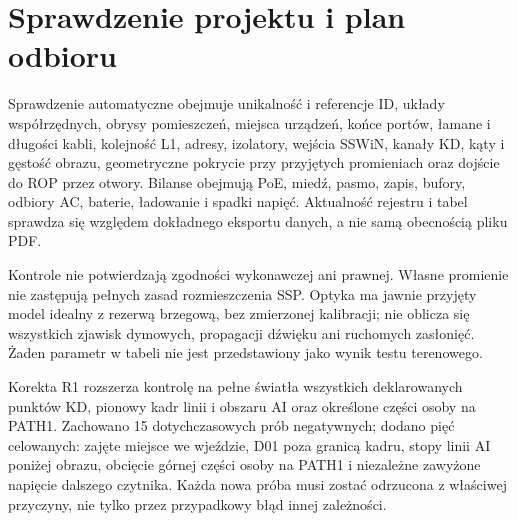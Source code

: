 \section{Sprawdzenie projektu i plan odbioru}
Sprawdzenie automatyczne obejmuje unikalność i referencje ID, układy współrzędnych, obrysy pomieszczeń, miejsca urządzeń, końce portów, łamane i długości kabli, kolejność L1, adresy, izolatory, wejścia SSWiN, kanały KD, kąty i gęstość obrazu, geometryczne pokrycie przy przyjętych promieniach oraz dojście do ROP przez otwory. Bilanse obejmują PoE, miedź, pasmo, zapis, bufory, odbiory AC, baterie, ładowanie i spadki napięć. Aktualność rejestru i tabel sprawdza się względem dokładnego eksportu danych, a nie samą obecnością pliku PDF.

Kontrole nie potwierdzają zgodności wykonawczej ani prawnej. Własne promienie nie zastępują pełnych zasad rozmieszczenia SSP. Optyka ma jawnie przyjęty model idealny z rezerwą brzegową, bez zmierzonej kalibracji; nie oblicza się wszystkich zjawisk dymowych, propagacji dźwięku ani ruchomych zasłonięć. Żaden parametr w tabeli nie jest przedstawiony jako wynik testu terenowego.

Korekta R1 rozszerza kontrolę na pełne światła wszystkich deklarowanych punktów KD, pionowy kadr linii i obszaru AI oraz określone części osoby na PATH1. Zachowano 15 dotychczasowych prób negatywnych; dodano pięć celowanych: zajęte miejsce we wjeździe, D01 poza granicą kadru, stopy linii AI poniżej obrazu, obcięcie górnej części osoby na PATH1 i niezależne zawyżone napięcie dalszego czytnika. Każda nowa próba musi zostać odrzucona z właściwej przyczyny, nie tylko przez przypadkowy błąd innej zależności.

